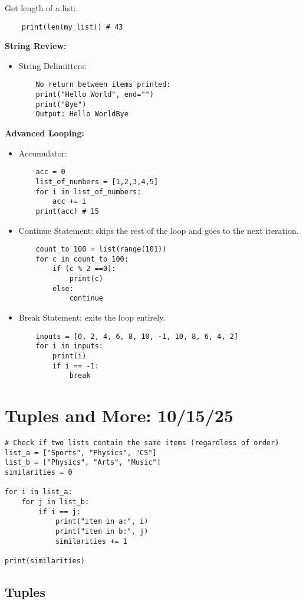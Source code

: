 \documentclass[11pt]{article}
\begin{document}
Get length of a list:
\begin{verbatim}
    print(len(my_list)) # 43
\end{verbatim}
\textbf{String Review:}
\begin{itemize}
    \item String Delimitters: 
    \begin{verbatim}
    No return between items printed:
    print("Hello World", end="") 
    print("Bye")
    Output: Hello WorldBye
    \end{verbatim}
\end{itemize}
\textbf{Advanced Looping:} 
\begin{itemize}
    \item Accumulator:
\begin{verbatim}
    acc = 0
    list_of_numbers = [1,2,3,4,5]
    for i in list_of_numbers:
        acc += i
    print(acc) # 15
\end{verbatim}
    \item Continue Statement: skips the rest of the loop and goes to the next iteration.
\begin{verbatim}
    count_to_100 = list(range(101))
    for c in count_to_100:
        if (c % 2 ==0):
            print(c)
        else:
            continue
\end{verbatim}
    \item Break Statement: exits the loop entirely.
\begin{verbatim}
    inputs = [0, 2, 4, 6, 8, 10, -1, 10, 8, 6, 4, 2]
    for i in inputs:
        print(i)
        if i == -1:
            break
\end{verbatim}
\end{itemize}
\section{Tuples and More: 10/15/25}

\begin{verbatim}
# Check if two lists contain the same items (regardless of order)
list_a = ["Sports", "Physics", "CS"]
list_b = ["Physics", "Arts", "Music"]
similarities = 0

for i in list_a:
    for j in list_b:
        if i == j:
            print("item in a:", i)
            print("item in b:", j)
            similarities += 1

print(similarities)
\end{verbatim}

\subsection*{Tuples}
\end{document}
